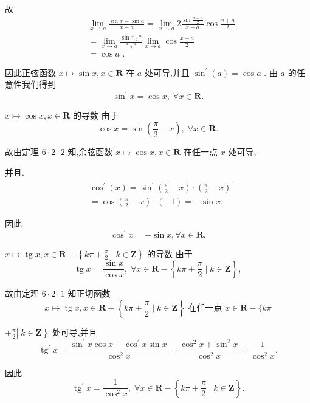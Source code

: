 故
\begin{align*}
	&\mathop{\lim }\limits_{{x \rightarrow  a}}\frac{\sin x - \sin a}{x - a} = \mathop{\lim }\limits_{{x \rightarrow  a}}2\frac{\sin \frac{x - a}{2}}{x - a}\cos \frac{x + a}{2}\\
	&= \mathop{\lim }\limits_{{x \rightarrow  a}}\frac{\sin \frac{x - a}{2}}{\frac{x - a}{2}}\mathop{\lim }\limits_{{x \rightarrow  a}}\cos \frac{x + a}{2}\\
	&= \cos a\text{ . }
\end{align*}

因此正弦函数 $x \mapsto  \sin x,x \in  \mathbf{R}$ 在 $a$ 处可导,并且 ${\sin }^{\prime }\left( a\right)  = \cos a$ . 由 $a$ 的任意性我们得到
$${\sin }^{\prime }x = \cos x,\;\forall x \in  \mathbf{R}.$$

$x \mapsto  \cos x,x \in  \mathbf{R}$ 的导数 由于
$$\cos x = \sin \left( {\frac{\pi }{2} - x}\right) ,\;\forall x \in  \mathbf{R}.$$

故由定理 $6 \cdot  2 \cdot  2$ 知,余弦函数 $x \mapsto  \cos x,x \in  \mathbf{R}$ 在任一点 $x$ 处可导,

并且.
\begin{align*}
	&{\cos }^{\prime }\left( x\right)  = {\sin }^{\prime }\left( {\frac{\pi }{2} - x}\right)  \cdot  {\left( \frac{\pi }{2} - x\right) }^{\prime }\\
	&= \cos \left( {\frac{\pi }{2} - x}\right)  \cdot  \left( {-1}\right)  =  - \sin x.
\end{align*}

因此
$${\cos }^{\prime }x =  - \sin x,\forall x \in  \mathbf{R}.$$

$x \mapsto  \operatorname{tg}x,x \in  \mathbf{R} - \left\{  {{k\pi } + \frac{\pi }{2} \mid  k \in  \mathbf{Z}}\right\}$ 的导数 由于
$$\operatorname{tg}x = \frac{\sin x}{\cos x},\;\forall x \in  \mathbf{R} - \left\{  {{k\pi } + \frac{\pi }{2} \mid  k \in  \mathbf{Z}}\right\}  ,$$

故由定理 $6 \cdot  2 \cdot  1$ 知正切函数
$$x \mapsto  \operatorname{tg}x,x \in  \mathbf{R} - \left\{  {{k\pi } + \frac{\pi }{2} \mid  k \in  \mathbf{Z}}\right\}  \text{ 在任一点 }x \in  \mathbf{R} - \{ {k\pi }$$

$\left. {\left. {+\frac{\pi }{2}}\right| \;k \in  \mathbf{Z}}\right\}$ 处可导,并且
$${\operatorname{tg}}^{\prime }x = \frac{{\sin }^{\prime }x\cos x - {\cos }^{\prime }x\sin x}{{\cos }^{2}x} = \frac{{\cos }^{2}x + {\sin }^{2}x}{{\cos }^{2}x} = \frac{1}{{\cos }^{2}x}.$$

因此
$${\operatorname{tg}}^{\prime }x = \frac{1}{{\cos }^{2}x},\;\forall x \in  \mathbf{R} - \left\{  {{k\pi } + \frac{\pi }{2} \mid  k \in  \mathbf{Z}}\right\}  .$$

